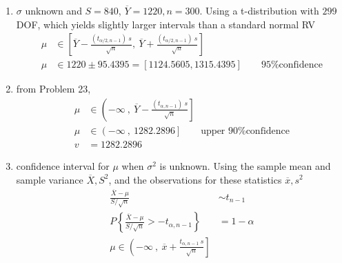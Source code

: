 \begin{enumerate}
	\item $ \sigma $ unknown and $ S = 840 $, $ \overline{Y} = 1220, n = 300$. Using a t-distribution with $ 299 $ DOF, which yields slightly larger intervals than a standard normal RV\\
	\begin{subequations}
		\begin{align}
			\mu &\in \left[ \overline{Y} - \frac{(t_{\alpha/2, n-1})\ s}{\sqrt{n}}, \ \overline{Y} + \frac{(t_{\alpha/2, n-1})\ s}{\sqrt{n}} \right] \nonumber \\
			\mu &\in 1220 \pm 95.4395 = [1124.5605, 1315.4395] \qquad \text{95\% confidence} 
		\end{align}
	\end{subequations}

	\item from Problem 23,
	\begin{subequations}
		\begin{align}
			\mu &\in \left(-\infty\ ,\  \overline{Y} - \frac{(t_{\alpha, n-1})\ s}{\sqrt{n}} \right] \nonumber \\
			\mu &\in \left(-\infty\ ,\ 1282.2896  \right] \qquad \text{upper 90\% confidence} \nonumber \\
			v &= 1282.2896
		\end{align}
	\end{subequations}
	
	\item confidence interval for $ \mu $ when $ \sigma^2 $ is unknown. Using the sample mean and sample variance $ \overline{X}, S^2 $, and the observations for these statistics $ \overline{x}, s^2 $\\
	\begin{subequations}
		\begin{align}
			\frac{\overline{X} - \mu}{S/\sqrt{n}} &\sim t_{n-1} \nonumber \\
			P \left\{ \frac{\overline{X} - \mu}{S/\sqrt{n}} > -t_{\alpha, n-1}\right\} &= 1 - \alpha \nonumber \\
			\mu \in \left( -\infty\ ,\ \overline{x} + \frac{t_{\alpha, n-1}\ s}{\sqrt{n}} \right]
		\end{align}
	\end{subequations}
	

\end{enumerate}
